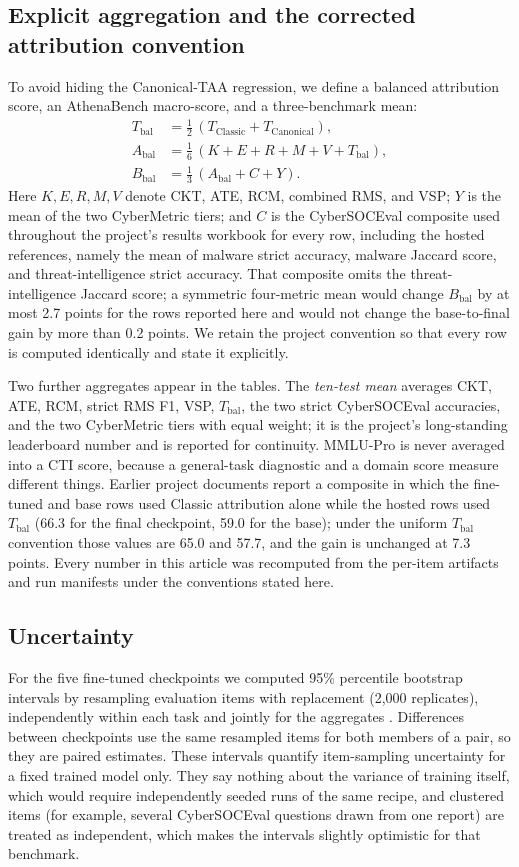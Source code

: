 \documentclass[twocolumn]{svjour3}
\newcommand{\Abal}{A_{\mathrm{bal}}}
\newcommand{\Bbal}{B_{\mathrm{bal}}}
\newcommand{\Tbal}{T_{\mathrm{bal}}}
\begin{document}
\subsection{Explicit aggregation and the corrected attribution convention}\label{sec:aggregation}
To avoid hiding the Canonical-TAA regression, we define a balanced attribution score, an AthenaBench macro-score, and a three-benchmark mean:
\begin{align}
 \Tbal &= \tfrac12\,(T_{\mathrm{Classic}}+T_{\mathrm{Canonical}}),\\
 \Abal &= \tfrac16\,(K+E+R+M+V+\Tbal),\\
 \Bbal &= \tfrac13\,(\Abal+C+Y).
\end{align}
Here $K,E,R,M,V$ denote CKT, ATE, RCM, combined RMS, and VSP; $Y$ is the mean of the two CyberMetric tiers; and $C$ is the CyberSOCEval composite used throughout the project's results workbook for every row, including the hosted references, namely the mean of malware strict accuracy, malware Jaccard score, and threat-intelligence strict accuracy. That composite omits the threat-intelligence Jaccard score; a symmetric four-metric mean would change $\Bbal$ by at most 2.7 points for the rows reported here and would not change the base-to-final gain by more than 0.2 points. We retain the project convention so that every row is computed identically and state it explicitly.

Two further aggregates appear in the tables. The \emph{ten-test mean} averages CKT, ATE, RCM, strict RMS F1, VSP, $\Tbal$, the two strict CyberSOCEval accuracies, and the two CyberMetric tiers with equal weight; it is the project's long-standing leaderboard number and is reported for continuity. MMLU-Pro is never averaged into a CTI score, because a general-task diagnostic and a domain score measure different things. Earlier project documents report a composite in which the fine-tuned and base rows used Classic attribution alone while the hosted rows used $\Tbal$ (66.3 for the final checkpoint, 59.0 for the base); under the uniform $\Tbal$ convention those values are 65.0 and 57.7, and the gain is unchanged at 7.3 points. Every number in this article was recomputed from the per-item artifacts and run manifests under the conventions stated here.

\subsection{Uncertainty}\label{sec:uncertainty}
For the five fine-tuned checkpoints we computed 95\% percentile bootstrap intervals by resampling evaluation items with replacement (2,000 replicates), independently within each task and jointly for the aggregates \cite{efron1993bootstrap}. Differences between checkpoints use the same resampled items for both members of a pair, so they are paired estimates. These intervals quantify item-sampling uncertainty for a fixed trained model only. They say nothing about the variance of training itself, which would require independently seeded runs of the same recipe, and clustered items (for example, several CyberSOCEval questions drawn from one report) are treated as independent, which makes the intervals slightly optimistic for that benchmark.
\end{document}
